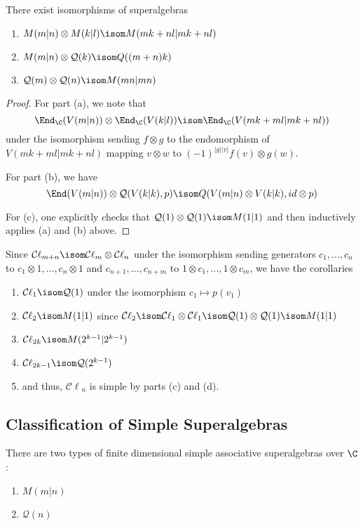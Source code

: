 \documentclass[11pt,leqno,oneside]{amsbook}
\renewcommand{\Q}{\mathcal{Q}}
\newcommand{\Cl}{\mathcal{C\ell}} %
\numberwithin{thm}{section}
\begin{document}
\begin{lem}
  There exist isomorphisms of superalgebras
  \begin{enumerate}
  \item \(M(m|n) \otimes M(k|l) \isom M(mk+nl|mk+nl)\)
  \item \(M(m|n) \otimes \Q(k) \isom Q((m+n)k)\)
  \item \(\Q(m) \otimes \Q(n) \isom M(mn|mn)\)
  \end{enumerate}
\end{lem}
\begin{proof}
  For part (a), we note that \[
    \End_\C(V(m|n)) \otimes \End_\C(V(k|l)) \isom \End_\C(V(mk+ml | mk+nl))
  \]
  under the isomorphism sending \(f \otimes g\) to the endomorphism of
  \(V(mk+ml | mk+nl)\) mapping \(v \otimes w\) to \((-1)^{|g||v|}f(v)
  \otimes g(w)\).

  For part (b), we have \[
    \End(V(m|n)) \otimes \Q(V(k|k),p) \isom Q(V(m|n) \otimes V(k|k), id
    \otimes p)
  \]

  For (c), one explicitly checks that \(\Q(1) \otimes \Q(1) \isom
  M(1|1)\) and then inductively applies (a) and (b) above.
\end{proof}
\begin{cor}
   Since \(\Cl_{m+n} \isom \Cl_m \otimes \Cl_n\) under the isomorphism
    sending generators \(c_1, \ldots, c_n\) to \(c_1 \otimes 1,
    \ldots, c_n \otimes 1\) and \(c_{n+1}, \ldots, c_{n+m}\) to \(1
    \otimes c_1, \ldots, 1 \otimes c_m\), we have the corollaries
  \begin{enumerate}
  \item \(\Cl_1 \isom \Q(1)\) under the isomorphism \(c_1 \mapsto
    p(v_1)\)
  \item \(\Cl_2 \isom M(1|1)\) since \(\Cl_2 \isom \Cl_1 \otimes \Cl_1
    \isom \Q(1) \otimes \Q(1) 
    \isom M(1|1)\)
  \item \(\Cl_{2k} \isom M(2^{k-1}|2^{k-1})\)
  \item \(\Cl_{2k-1} \isom \Q(2^{k-1})\)
  \item and thus, \(\Cl_n\) is simple by parts (c) and (d).
  \end{enumerate}
\end{cor}
\subsection{Classification of Simple Superalgebras}
\begin{thm}
  There are two types of finite dimensional simple associative
  superalgebras over \(\C\):
  \begin{enumerate}
  \item \(M(m|n)\)
  \item \(\Q(n)\)
  \end{enumerate}
\end{thm} 
\end{document}

